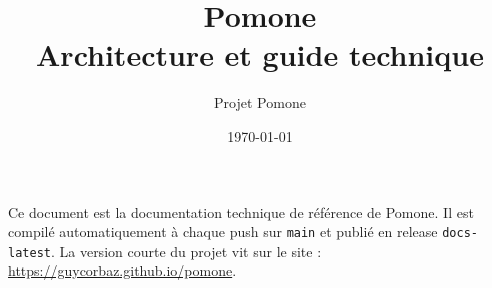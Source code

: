 \documentclass[a4paper,11pt]{article}
\title{\vspace{-2em}\textcolor{pomonegreen}{\Huge\textbf{Pomone}}\\[0.3em]
  \large Architecture et guide technique}
\author{Projet Pomone}
\date{\today}
\begin{document}
\maketitle

\begin{notebox}
Ce document est la documentation technique de référence de Pomone. Il est compilé automatiquement à chaque push sur \texttt{main} et publié en release \texttt{docs-latest}. La version courte du projet vit sur le site : \url{https://guycorbaz.github.io/pomone}.
\end{notebox}

\tableofcontents
\clearpage






\end{document}
